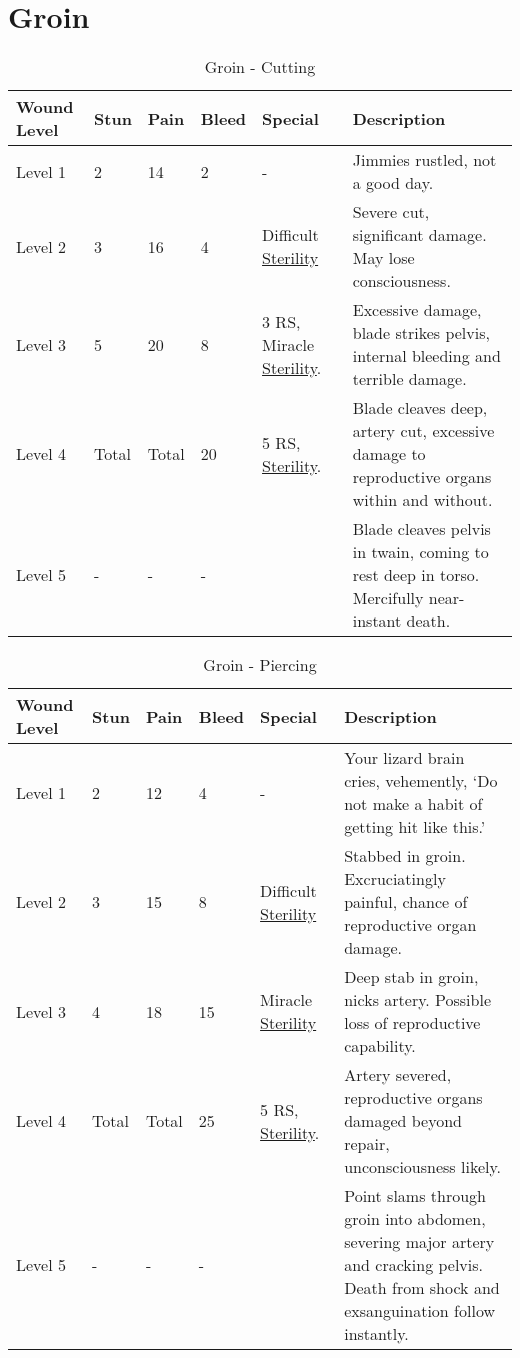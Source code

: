 \documentclass[oneside,11pt,english]{book}
\begin{document}
\section{Groin} \vspace{-25pt} \label{sec:groin}
\begin{table}[hb] %
	\caption{Groin - Cutting}
	\label{wound:Groin - Cutting}
	\begin{tabu} to 
Wound Level &Stun &Pain &Bleed &Special &Description\\\toprule
Level 1& 2& 14& 2& - &Jimmies rustled, not a good day.\\
Level 2& 3& 16& 4& Difficult~ \hyperref[bane:Barren/Sterility]{Sterility} &Severe cut, significant damage. May lose consciousness.\\
Level 3& 5& 20& 8
	& 3 RS, \newline
		Miracle~ \hyperref[bane:Barren/Sterility]{Sterility}.
	&Excessive damage, blade strikes pelvis, internal bleeding and terrible damage.\\
Level 4& Total& Total& 20
	& 5 RS, \newline
		\hyperref[bane:Barren/Sterility]{Sterility}.
	&Blade cleaves deep, artery cut, excessive damage to reproductive organs within and without.\\
Level 5& - &- &- && Blade cleaves pelvis in twain, coming to rest deep in torso. Mercifully near-instant death.\\
	\end{tabu}
\end{table}

\begin{table}[hb] %
	\caption{Groin - Piercing}
	\label{wound:Groin - Piercing}
	\begin{tabu} to 
Wound Level &Stun &Pain &Bleed &Special &Description\\\toprule
Level 1& 2& 12& 4& - &Your lizard brain cries, vehemently, ‘Do not make a habit of getting hit like this.’\\
Level 2& 3& 15& 8& Difficult~ \hyperref[bane:Barren/Sterility]{Sterility}&Stabbed in groin. Excruciatingly painful, chance of reproductive organ damage.\\
Level 3& 4& 18& 15& Miracle~ \hyperref[bane:Barren/Sterility]{Sterility} &Deep stab in groin, nicks artery. Possible loss of reproductive capability.\\
Level 4& Total& Total& 25 
	& 5 RS, \newline
		\hyperref[bane:Barren/Sterility]{Sterility}.
	&Artery severed, reproductive organs damaged beyond repair, unconsciousness likely.\\
Level 5& - &- &- && Point slams through groin into abdomen, severing major artery and cracking pelvis. Death from shock and exsanguination follow instantly.\\
	\end{tabu}
\end{table}
\end{document}
